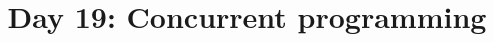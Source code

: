 \documentclass{article}
\begin{document}
\title{Day 19: Concurrent programming}
\author{}
\date{}

\maketitle


\end{document}
